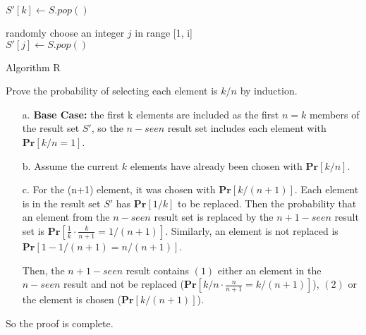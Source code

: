 \documentclass{assignment}
\begin{document}
    \begin{homeworkProblem}
    
     
     \begin{algorithm}[H]
 \BlankLine
{} {
	$S'[k] \leftarrow S.pop()$
}

 {
	randomly choose an integer $j$ in range [1, i] \\
	 {$S'[j] \leftarrow S.pop()$}
	
}

\caption{Algorithm R} \end{algorithm}
Prove the probability of selecting each element is $k/n$ by induction.

\begin{enumerate}
\item[a.] \textbf{Base Case:} the first k elements are included as the first $n=k$ members of the result set $S'$, so the $n-seen$ result set includes each element with $\mathbf{Pr}[k/n=1]$.

\item[b.] Assume the current $k$ elements have already been chosen with $\mathbf{Pr}[k/n]$.
\item[c.] For the (n+1) element, it was chosen with $\mathbf{Pr}[k/(n+1)]$. Each element is in the result set $S'$ has $\mathbf{Pr}[1/k]$ to be replaced. Then the probability that an element from the $n-seen$ result set is replaced by the $n+1-seen$ result set is
$\displaystyle \mathbf{Pr}[\frac{1}{k}\cdot \frac{k}{n+1}=1/(n+1)]$. Similarly, an element is not replaced is 
$\displaystyle \mathbf{Pr}[1-1/(n+1)=n/(n+1)]$. 

Then, the $n+1-seen$ result contains $(1)$ either an element in the $n-seen$ result and not be replaced ($\mathbf{Pr}[k/n \cdot \frac{n}{n+1}=k/(n+1)]$), $(2)$ or  the element is chosen ($\mathbf{Pr}[k/(n+1)]$). 




\end{enumerate}
So the proof is complete. 
    
    
    \end{homeworkProblem} 
    
\end{document}
